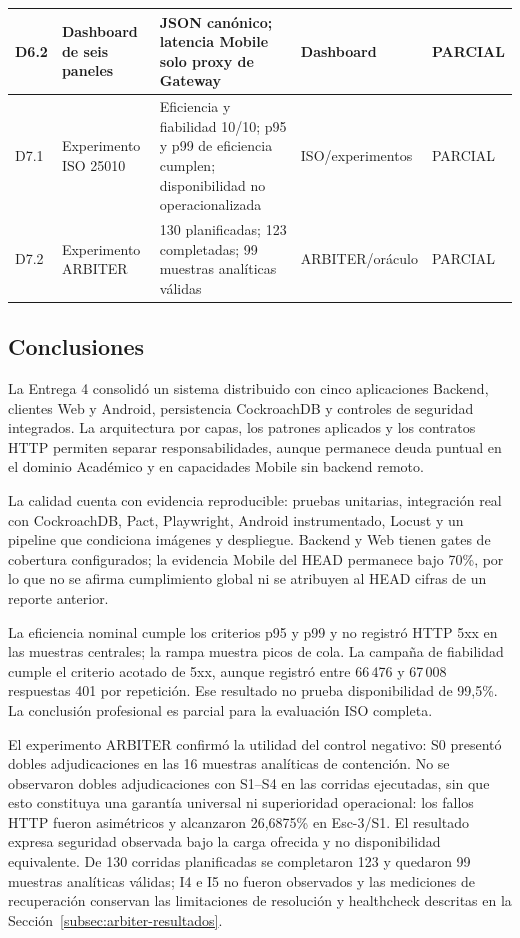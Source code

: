 \begin{table}[ht]
\begin{tabular}{|p{1.1cm}|p{3.0cm}|p{4.1cm}|p{2.2cm}|p{1.7cm}|}
    \hline
    D6.2 & Dashboard de seis paneles & JSON canónico; latencia Mobile solo proxy de Gateway & Dashboard & PARCIAL \\
    \hline
    D7.1 & Experimento ISO 25010 & Eficiencia y fiabilidad 10/10; p95 y p99 de eficiencia cumplen; disponibilidad no operacionalizada & ISO/experimentos & PARCIAL \\
    \hline
    D7.2 & Experimento ARBITER & 130 planificadas; 123 completadas; 99 muestras analíticas válidas & ARBITER/oráculo & PARCIAL \\
    \hline
  \end{tabular}
\end{table}

\subsection{Conclusiones}
\label{subsec:conclusiones-e4}

La Entrega 4 consolidó un sistema distribuido con cinco aplicaciones Backend,
clientes Web y Android, persistencia CockroachDB y controles de seguridad
integrados. La arquitectura por capas, los patrones aplicados y los contratos
HTTP permiten separar responsabilidades, aunque permanece deuda puntual en el
dominio Académico y en capacidades Mobile sin backend remoto.

La calidad cuenta con evidencia reproducible: pruebas unitarias, integración
real con CockroachDB, Pact, Playwright, Android instrumentado, Locust y un
pipeline que condiciona imágenes y despliegue. Backend y Web tienen gates de
cobertura configurados; la evidencia Mobile del HEAD permanece bajo 70\%, por
lo que no se afirma cumplimiento global ni se atribuyen al HEAD cifras de un
reporte anterior.

La eficiencia nominal cumple los criterios p95 y p99 y no registró HTTP 5xx en
las muestras centrales; la rampa muestra picos de cola. La campaña de fiabilidad cumple el criterio acotado de
5xx, aunque registró entre 66\,476 y 67\,008 respuestas 401 por repetición. Ese
resultado no prueba disponibilidad de 99,5\%. La conclusión profesional es
parcial para la evaluación ISO completa.

El experimento ARBITER confirmó la utilidad del control negativo: S0 presentó
dobles adjudicaciones en las 16 muestras analíticas de contención. No se
observaron dobles adjudicaciones con S1--S4 en las corridas ejecutadas, sin que
esto constituya una garantía universal ni superioridad operacional: los fallos
HTTP fueron asimétricos y alcanzaron 26,6875\% en Esc-3/S1. El resultado expresa
seguridad observada bajo la carga ofrecida y no disponibilidad equivalente. De
130 corridas planificadas se
completaron 123 y quedaron 99 muestras analíticas válidas; I4 e I5 no fueron
observados y las mediciones de recuperación conservan las limitaciones de
resolución y healthcheck descritas en la Sección~\ref{subsec:arbiter-resultados}.

